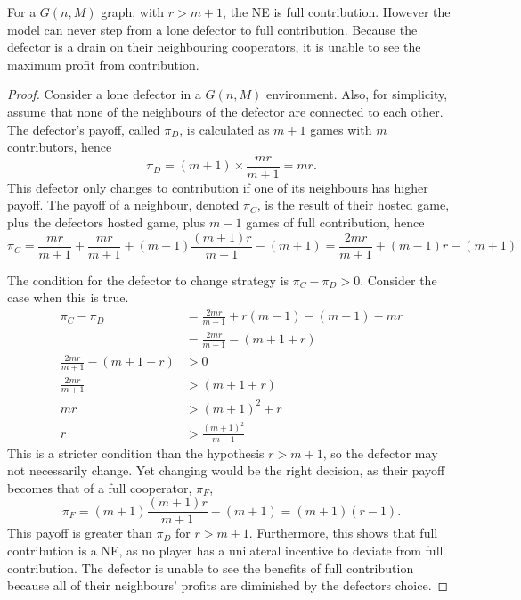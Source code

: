 \begin{remark1} \label{remark1}
For a $G(n,M)$ graph, with $r>m+1$, the NE is full contribution. However the model can never step from a lone defector to full contribution. Because the defector is a drain on their neighbouring cooperators, it is unable to see the maximum profit from contribution. 
\end{remark1}
\begin{proof}
Consider a lone defector in a $G(n,M)$ environment. Also, for simplicity, assume that none of the neighbours of the defector are connected to each other. The defector's payoff, called $\pi_D$, is calculated as $m+1$ games with $m$ contributors, hence $$\pi_D = (m+1) \times \frac{mr}{m+1} = mr. $$ This defector only changes to contribution if one of its neighbours has higher payoff. The payoff of a neighbour, denoted $\pi_C$, is the result of their hosted game, plus the defectors hosted game, plus $m-1$ games of full contribution, hence $$\pi_C = \frac{mr}{m+1}+\frac{mr}{m+1} + (m-1) \frac{(m+1 )r}{m+1} - (m+1) = \frac{2mr}{m+1} +(m-1)r - (m+1) $$ 


The condition for the defector to change strategy is $\pi_C  - \pi_D>0$. Consider the case when this is true. \\
\begin{align*}
    \pi_C - \pi_D &= \frac{2mr}{m+1} +r(m-1) -(m+1)-mr\\
    &= \frac{2mr}{m+1} -(m+1+r)\\
    \frac{2mr}{m+1} -(m+1+r) &> 0\\
    \frac{2mr}{m+1} &>(m+1+r)\\
    mr &>(m+1)^2+r\\
    r&>\frac{(m+1)^2}{m-1}
\end{align*}
This is a stricter condition than the hypothesis $r>m+1$, so the defector may not necessarily change. Yet changing would be the right decision, as their payoff becomes that of a full cooperator, $\pi_{F}$, $$ \pi_F = (m+1)\frac{(m+1)r}{m+1} - (m+1) = (m+1)(r-1). $$ This payoff is greater than $\pi_D$ for $r>m+1$. Furthermore, this shows that full contribution is a NE, as no player has a unilateral incentive to deviate from full contribution. The defector is unable to see the benefits of full contribution because all of their neighbours' profits are diminished by the defectors choice. \end{proof}



